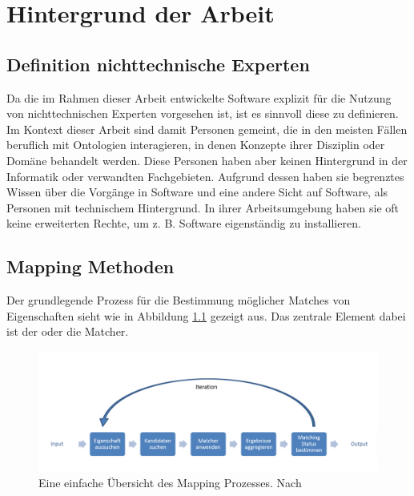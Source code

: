 %
\chapter{Hintergrund der Arbeit}
\label{chap:background}

	\section{Definition nichttechnische Experten}
	Da die im Rahmen dieser Arbeit entwickelte Software explizit für die Nutzung
	von nichttechnischen Experten vorgesehen ist, ist es sinnvoll diese zu definieren.
	Im Kontext dieser Arbeit sind damit Personen gemeint, die in den meisten Fällen
	beruflich mit Ontologien interagieren, in denen Konzepte ihrer Disziplin oder
	Domäne behandelt werden. Diese Personen haben aber keinen Hintergrund in der
	Informatik oder verwandten Fachgebieten. Aufgrund dessen haben sie begrenztes
	Wissen über die Vorgänge in Software und eine andere Sicht auf Software, als
	Personen mit technischem Hintergrund. In ihrer Arbeitsumgebung haben sie oft
	keine erweiterten Rechte, um z. B. Software eigenständig zu installieren.

	\section{Mapping Methoden}
	Der grundlegende Prozess für die Bestimmung möglicher Matches von Eigenschaften
	sieht wie in Abbildung \ref{fig1} gezeigt aus. Das zentrale Element dabei ist
	der oder die Matcher. \cite{Hoo14}
	
	\begin{figure}[ht]
	\centering
	\includegraphics[width=1.0\textwidth]{pics/simple-high-level-view-of-a-mapping-process.png}
	\caption{Eine einfache Übersicht des Mapping Prozesses. Nach \cite{Hoo14}}
	\label{fig1}
	\end{figure}
	
